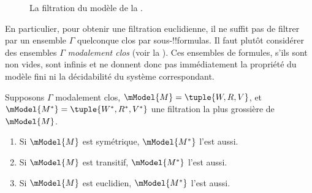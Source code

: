 \documentclass[../../../include/open-logic-section]{subfiles}
\begin{document}
\begin{figure}[ht]
  \centering
  \caption{La filtration du modèle de la .}
\end{figure}

En particulier, pour obtenir une filtration euclidienne, il ne suffit
pas de filtrer par un ensemble $\Gamma$ quelconque clos par
sous-!!{formula}s. Il faut plutôt considérer des ensembles $\Gamma$
\emph{modalement clos} (voir la ). Ces
ensembles de formules, s’ils sont non vides, sont infinis et ne donnent donc pas immédiatement
la propriété du modèle fini ni la décidabilité du système correspondant.

\begin{thm}
  Supposons $\Gamma$ modalement clos,
  $\mModel{M}=\tuple{W,R,V}$, et
  $\mModel{M^*} = \tuple{W^*,R^*,V^*}$ une filtration la plus grossière
  de $\mModel{M}$.
  \begin{enumerate}
  \item Si $\mModel{M}$ est symétrique, $\mModel{M^*}$ l'est aussi.
  \item Si $\mModel{M}$ est transitif, $\mModel{M^*}$ l'est aussi.
  \item Si $\mModel{M}$ est euclidien, $\mModel{M^*}$ l'est aussi.
  \end{enumerate}
\end{thm}
\end{document}
